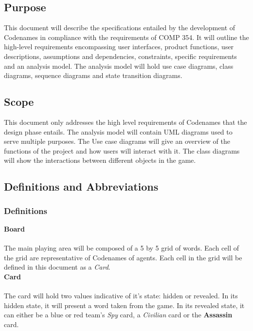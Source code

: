 \documentclass[10pt, a4paper]{article}
\begin{document}
	\subsection{Purpose}
	
	This document will describe the specifications entailed by the development of Codenames in compliance with the requirements of COMP 354. It will outline the high-level requirements encompassing user interfaces, product functions, user descriptions, assumptions and dependencies, constraints, specific requirements and an analysis model. The analysis model will hold use case diagrams, class diagrams, sequence diagrams and state transition diagrams.
	
	\subsection{Scope}
	
	This document only addresses the high level requirements of Codenames  that the design phase entails. The analysis model will contain UML diagrams used to serve multiple purposes. The Use case diagrams will give an overview of the functions of the project and how users will interact with it. The class diagrams will show the interactions between different objects in the game. \\
	

	\subsection{Definitions and Abbreviations}
	
		\subsubsection{Definitions}
	
		\textbf{Board} \\
		\\
		The main playing area will be composed of a 5 by 5 grid of words. Each cell of the grid are representative of Codenames of agents. Each cell in the grid will be defined in this document as a \textit{Card}.\\
	
		\textbf{Card} \\
		\\
		The card will hold two values indicative of it's state: hidden or revealed. In its hidden state, it will present a word taken from the game. In its revealed state, it can either be a blue or red team's \textit{Spy} card, a \textit{Civilian} card or the \textbf{Assassin} card.\\
		
\end{document}
